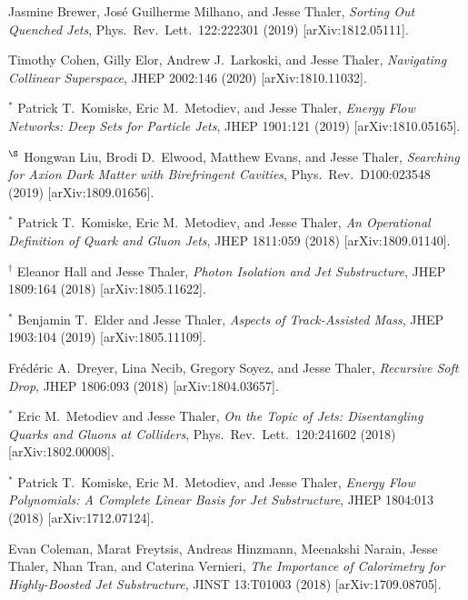 \begin{list}{[]\addtocounter{jessecount}{-1}}{\leftmargin=3em \itemsep=4pt}
\item
 Jasmine Brewer, José Guilherme Milhano, and Jesse Thaler,
\emph{Sorting Out Quenched Jets},
Phys.\ Rev.\ Lett.\ 122:222301 (2019)
[arXiv:1812.05111].

\item
 Timothy Cohen, Gilly Elor, Andrew J.\ Larkoski, and Jesse Thaler,
\emph{Navigating Collinear Superspace},
JHEP 2002:146 (2020)
[arXiv:1810.11032].

\item
${}^\ast$ Patrick T.\ Komiske, Eric M.\ Metodiev, and Jesse Thaler,
\emph{Energy Flow Networks: Deep Sets for Particle Jets},
JHEP 1901:121 (2019)
[arXiv:1810.05165].

\item
${}^\S$ Hongwan Liu, Brodi D.\ Elwood, Matthew Evans, and Jesse Thaler,
\emph{Searching for Axion Dark Matter with Birefringent Cavities},
Phys.\ Rev.\ D100:023548 (2019)
[arXiv:1809.01656].

\item
${}^\ast$ Patrick T.\ Komiske, Eric M.\ Metodiev, and Jesse Thaler,
\emph{An Operational Definition of Quark and Gluon Jets},
JHEP 1811:059 (2018)
[arXiv:1809.01140].

\item
${}^\dagger$ Eleanor Hall and Jesse Thaler,
\emph{Photon Isolation and Jet Substructure},
JHEP 1809:164 (2018)
[arXiv:1805.11622].

\item
${}^\ast$ Benjamin T.\ Elder and Jesse Thaler,
\emph{Aspects of Track-Assisted Mass},
JHEP 1903:104 (2019)
[arXiv:1805.11109].

\item
 Frédéric A.\ Dreyer, Lina Necib, Gregory Soyez, and Jesse Thaler,
\emph{Recursive Soft Drop},
JHEP 1806:093 (2018)
[arXiv:1804.03657].

\item
${}^\ast$ Eric M.\ Metodiev and Jesse Thaler,
\emph{On the Topic of Jets: Disentangling Quarks and Gluons at Colliders},
Phys.\ Rev.\ Lett.\ 120:241602 (2018)
[arXiv:1802.00008].

\item
${}^\ast$ Patrick T.\ Komiske, Eric M.\ Metodiev, and Jesse Thaler,
\emph{Energy Flow Polynomials: A Complete Linear Basis for Jet Substructure},
JHEP 1804:013 (2018)
[arXiv:1712.07124].

\item
 Evan Coleman, Marat Freytsis, Andreas Hinzmann, Meenakshi Narain, Jesse Thaler, Nhan Tran, and Caterina Vernieri,
\emph{The Importance of Calorimetry for Highly-Boosted Jet Substructure},
JINST 13:T01003 (2018)
[arXiv:1709.08705].


\end{list}
